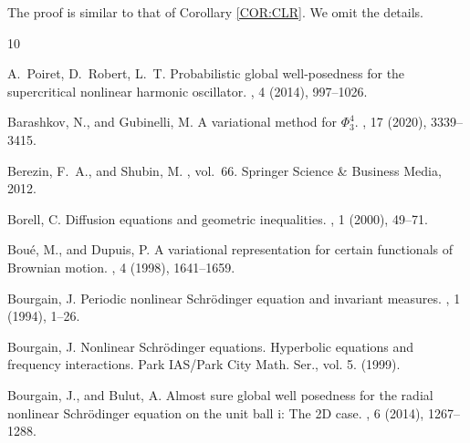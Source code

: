 \documentclass[%
11pt,  reqno]{amsart}
\theoremstyle{remarkstyle}
\newcommand{\1}{\hspace{0.2mm}\text{I}\hspace{0.2mm}}
\numberwithin{equation}{section}
\numberwithin{theorem}{section}
\begin{document}
	The proof is similar to that of Corollary \ref{COR:CLR}. We omit the details.
	
	
	
	\newpage
	
	
	\begin{thebibliography}{10}
		
		{\sc A.~Poiret, D.~Robert, L.~T.}
		\newblock Probabilistic global well-posedness for the supercritical nonlinear
		harmonic oscillator.
		, 4 (2014), 997--1026.
		
		{\sc Barashkov, N., and Gubinelli, M.}
		\newblock A variational method for {$\Phi^4_3$}.
		, 17 (2020), 3339--3415.
		
		{\sc Berezin, F.~A., and Shubin, M.}
		, vol.~66.
		\newblock Springer Science \& Business Media, 2012.
		
		{\sc Borell, C.}
		\newblock Diffusion equations and geometric inequalities.
		, 1 (2000), 49--71.
		
		{\sc Bou{\'e}, M., and Dupuis, P.}
		\newblock A variational representation for certain functionals of {B}rownian
		motion.
		, 4 (1998), 1641--1659.
		
		{\sc Bourgain, J.}
		\newblock Periodic nonlinear {S}chrödinger equation and invariant measures.
		, 1 (1994), 1--26.
		
		{\sc Bourgain, J.}
		\newblock Nonlinear {S}chr{\"o}dinger equations. {H}yperbolic equations and
		frequency interactions. {Park IAS/Park City Math. Ser.}, vol. 5.
		 (1999).
		
		{\sc Bourgain, J., and Bulut, A.}
		\newblock Almost sure global well posedness for the radial nonlinear
		{S}chr\"odinger equation on the unit ball i: {T}he {2D} case.
		, 6 (2014), 1267--1288.
		

\end{thebibliography}
\end{document}
